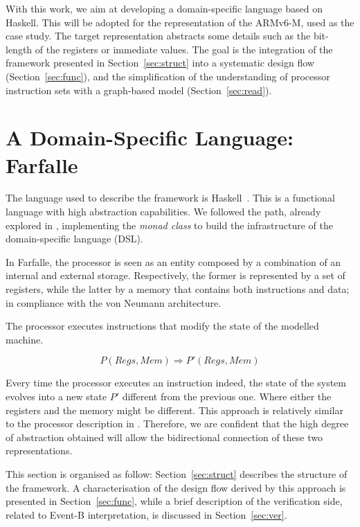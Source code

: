 \documentclass[conference]{IEEEtran}
\begin{document}
With this work, we aim at developing a domain-specific language based on Haskell. This will be
adopted for the representation of the ARMv6-M, used as the case study. The target
representation abstracts some details such as the bit-length of the registers or immediate
values. The goal is the integration of the framework presented in Section~\ref{sec:struct}
into a systematic design flow (Section~\ref{sec:func}), and the simplification of the understanding of
processor instruction sets with a graph-based model (Section~\ref{sec:read}).




\section{A Domain-Specific Language: Farfalle}
\label{sec:dsl}
The language used to describe the framework is Haskell~\cite{haskell}. This is a 
functional language with high abstraction capabilities.
We followed the path, already explored in \cite{armv7}, implementing the \textit{monad class}
to build the infrastructure of the domain-specific language (DSL).

In Farfalle, the processor is seen as an entity composed by a combination of an internal and
external storage. Respectively, the former is represented by a set of registers,
while the latter by a memory that contains both instructions and data; in compliance with the
von Neumann architecture. 

The processor executes instructions that modify the state of the modelled machine.

$$P(Regs, Mem) \Rightarrow P'(Regs, Mem)$$

\noindent Every time the processor executes an instruction indeed, the state of the system
evolves into a new state $P'$ different from the previous one. Where either the registers and
the memory might be different. This approach is relatively similar to the processor
description in \cite{isaFunc}. Therefore, we are confident that the high degree of
abstraction obtained will allow the bidirectional connection of these two representations.

This section is organised as follow: Section~\ref{sec:struct} describes the structure of the
framework. A characterisation of the design flow derived by this approach is presented in
Section~\ref{sec:func}, while a brief description of the verification side, related to Event-B
interpretation, is discussed in Section~\ref{sec:ver}.
\end{document}
